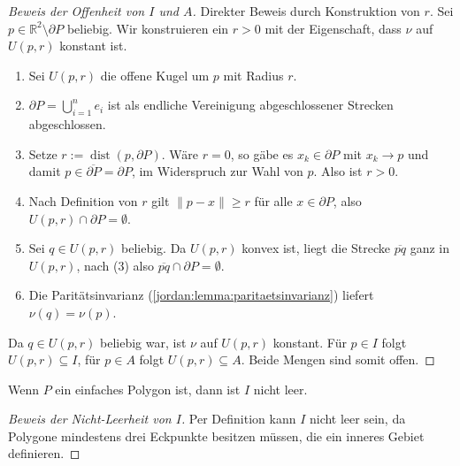 \begin{proof}[Beweis der Offenheit von $I$ und $A$]
    Direkter Beweis durch Konstruktion von $r$. 
    Sei $p \in \mathbb{R}^2 \setminus \partial P$ beliebig. Wir konstruieren ein
    $r > 0$ mit der Eigenschaft, dass $\nu$ auf $U(p,r)$ konstant ist.

    \begin{enumerate}
        \item Sei $U(p,r)$ die offene Kugel um $p$ mit Radius $r$.

        \item $\partial P = \bigcup_{i=1}^{n} e_i$ ist als endliche Vereinigung
            abgeschlossener Strecken abgeschlossen.

        \item Setze $r := \operatorname{dist}(p, \partial P)$. Wäre $r = 0$, so gäbe
            es $x_k \in \partial P$ mit $x_k \to p$ und damit
            $p \in \overline{\partial P} = \partial P$, im Widerspruch zur Wahl
            von $p$. Also ist $r > 0$.

        \item Nach Definition von $r$ gilt $\lVert p - x \rVert \ge r$ für alle
            $x \in \partial P$, also $U(p,r) \cap \partial P = \emptyset$.

        \item Sei $q \in U(p,r)$ beliebig. Da $U(p,r)$ konvex ist, liegt die
            Strecke $\overline{pq}$ ganz in $U(p,r)$, nach (3) also
            $\overline{pq} \cap \partial P = \emptyset$.

        \item Die Paritätsinvarianz (\ref{jordan:lemma:paritaetsinvarianz}) liefert
            $\nu(q) = \nu(p)$.
\end{enumerate}

Da $q \in U(p,r)$ beliebig war, ist $\nu$ auf $U(p,r)$ konstant. Für
$p \in I$ folgt $U(p,r) \subseteq I$, für $p \in A$ folgt
$U(p,r) \subseteq A$. Beide Mengen sind somit offen.
\end{proof}

\begin{lemma}
    Wenn $P$ ein einfaches Polygon ist, dann ist $I$ nicht leer.
\end{lemma}

\begin{proof}[Beweis der Nicht-Leerheit von $I$]
    Per Definition kann $I$ nicht leer sein, da Polygone mindestens drei Eckpunkte besitzen müssen, die ein inneres Gebiet definieren. 
\end{proof}

